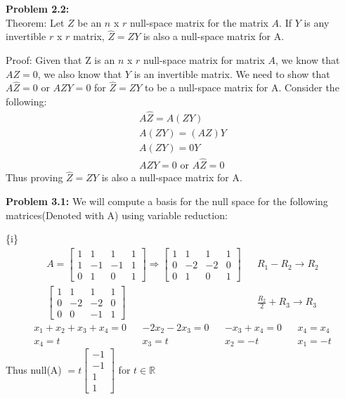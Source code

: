 \documentclass{article}
\begin{document}
 
\pagestyle{fancy}

\textbf{Problem 2.2:} \\
Theorem: Let $Z$ be an $n$ x $r$ null-space matrix for the matrix $A$. If $Y$ is any invertible $r$ x $r$ matrix,  $\hat{Z} = ZY$ is also a null-space matrix for A.

Proof: Given that Z is an $n$ x $r$ null-space matrix for matrix $A$, we know that $AZ = 0$, we also know that $Y$ is an invertible matrix. We need to show that $A\hat{Z} = 0$ or $AZY = 0$ for $\hat{Z} = ZY$ to be a null-space matrix for A. Consider the following:
\begin{align*}
    A \hat{Z} = A(ZY) \\
    A(ZY) = (AZ)Y \\
    A(ZY) = 0Y \\
    AZY = 0 \text{ or } A\hat{Z} = 0
\end{align*}
Thus proving $\hat{Z} = ZY$ is also a null-space matrix for A. \newline

\textbf{Problem 3.1:} We will compute a basis for the null space for the following matrices(Denoted with A) using variable reduction:

\{i\}
\begin{align*} A =
    \begin{bmatrix}
        1 & 1 & 1 & 1 \\
        1 & -1 & -1 & 1 \\
        0 & 1 & 0 & 1
    \end{bmatrix} \Rightarrow
    \begin{bmatrix}
        1 & 1 & 1 & 1 \\
        0 & -2 & -2 & 0 \\
        0 & 1 & 0 & 1
    \end{bmatrix} && R_1 - R_2 \xrightarrow{} R_2 \\
    \begin{bmatrix}
        1 & 1 & 1 & 1 \\
        0 & -2 & -2 & 0 \\
        0 & 0 & -1 & 1
    \end{bmatrix} && \frac{R_2}{2} + R_3 \xrightarrow{} R_3 
\end{align*}\begin{align*}
    x_1 + x_2 + x_3 + x_4 = 0 && -2x_2 - 2x_3 = 0 && -x_3 + x_4 = 0 && x_4 = x_4 \\
    x_4 = t && x_3 = t && x_2 = -t && x_1 = -t
\end{align*}
Thus null(A) $ = t\begin{bmatrix} -1 \\ -1 \\ 1 \\ 1\end{bmatrix}$ for $t \in \mathbb{R}$ \newline
\end{document}
